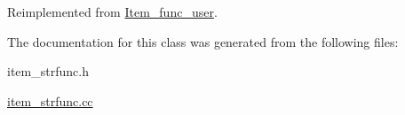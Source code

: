 Reimplemented from \mbox{\hyperlink{classItem__func__user_a3e90c1dfcb5fc3007e8f77e9c3398f93}{Item\+\_\+func\+\_\+user}}.



The documentation for this class was generated from the following files\+:\begin{DoxyCompactItemize}
\item 
item\+\_\+strfunc.\+h\item 
\mbox{\hyperlink{item__strfunc_8cc}{item\+\_\+strfunc.\+cc}}\end{DoxyCompactItemize}
